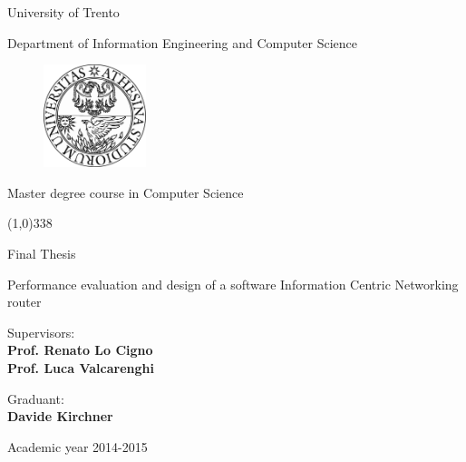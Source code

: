 \documentclass[12pt,a4paper,twoside]{book}
\begin{document}
\begin{titlepage}
  \begin{center}
    \begin{Large}University of Trento\\\end{Large}
    Department of Information Engineering and Computer Science
    \vspace{10pt}
    \begin{figure}[h!]
      \begin{center}
        \includegraphics[width=3cm]{img/unitn_logo.pdf}
      \end{center}
    \end{figure}

    Master degree course in Computer Science

    \vspace{10pt}
    \line(1,0){338}
    \vspace{10pt}

    Final Thesis\\
  \end{center}

  \vspace{3cm}

  \begin{center}
    \begin{Large}
      Performance evaluation and design of a software Information Centric
      Networking router\\\end{Large}
    \vspace{3cm}
  \end{center}

  \noindent
  \begin{minipage}[t]{.7\linewidth}
    Supervisors:\\ 
    \textbf{Prof. Renato Lo Cigno}\\
    \textbf{Prof. Luca Valcarenghi}
  \end{minipage}%
  \begin{minipage}[t]{.25\linewidth}
    Graduant:\\
    \textbf{Davide Kirchner}
  \end{minipage}

  \vspace{2cm}
  \begin{center}
    Academic year 2014-2015
  \end{center}
\end{titlepage}
\end{document}
